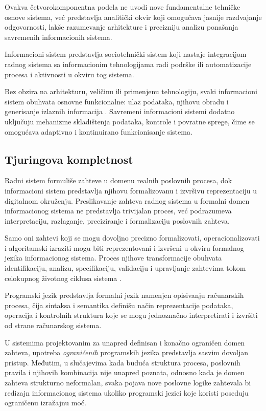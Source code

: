 Ovakva četvorokomponentna podela ne uvodi nove fundamentalne tehničke osnove sistema, već predstavlja analitički okvir koji omogućava jasnije razdvajanje odgovornosti, lakše razumevanje arhitekture i precizniju analizu ponašanja savremenih informacionih sistema.

\begin{definicija}
Informacioni sistem predstavlja sociotehnički sistem koji nastaje integracijom radnog sistema sa informacionim tehnologijama radi podrške ili automatizacije procesa i aktivnosti u okviru tog sistema.
\end{definicija}

Bez obzira na arhitekturu, veličinu ili primenjenu tehnologiju, svaki informacioni sistem obuhvata osnovne funkcionalne: ulaz podataka, njihovu obradu i generisanje izlaznih informacija \cite{long2005towards}. Savremeni informacioni sistemi dodatno uključuju mehanizme skladištenja podataka, kontrole i povratne sprege, čime se omogućava adaptivno i kontinuirano funkcionisanje sistema.

\subsection{Tjuringova kompletnost}
Radni sistem formuliše zahteve u domenu realnih poslovnih procesa, dok informacioni sistem predstavlja njihovu formalizovanu i izvršivu reprezentaciju u digitalnom okruženju. Preslikavanje zahteva radnog sistema u formalni domen informacionog sistema ne predstavlja trivijalan proces, već podrazumeva interpretaciju, razlaganje, preciziranje i formalizaciju poslovnih zahteva.

Samo oni zahtevi koji se mogu dovoljno precizno formalizovati, operacionalizovati i algoritamski izraziti mogu biti reprezentovani i izvršeni u okviru formalnog jezika informacionog sistema. Proces njihove transformacije obuhvata identifikaciju, analizu, specifikaciju, validaciju i upravljanje zahtevima tokom celokupnog životnog ciklusa sistema \cite{zave1997classification}.

\begin{definicija}
Programski jezik \cite{pierce2002types} predstavlja formalni jezik namenjen opisivanju računarskih procesa, čija sintaksa i semantika definišu način reprezentacije podataka, operacija i kontrolnih struktura koje se mogu jednoznačno interpretirati i izvršiti od strane računarskog sistema.
\end{definicija}

U sistemima projektovanim za unapred definisan i konačno ograničen domen zahteva, upotreba \textit{ograničenih} programskih jezika predstavlja sasvim dovoljan pristup. Međutim, u slučajevima kada buduća struktura procesa, poslovnih pravila i njihovih kombinacija nije unapred poznata, odnosno kada je domen zahteva strukturno neformalan, svaka pojava nove poslovne logike zahtevala bi redizajn informacionog sistema ukoliko programski jezici koje koristi poseduju ograničenu izražajnu moć.

